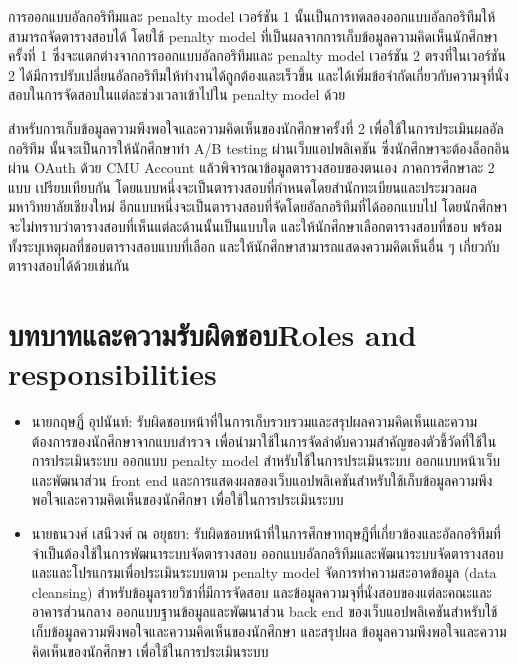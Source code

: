 การออกแบบอัลกอริทึมและ penalty model เวอร์ชัน 1 นั้นเป็นการทดลองออกแบบอัลกอริทึมให้สามารถจัดตารางสอบได้
โดยใช้ penalty model ที่เป็นผลจากการเก็บข้อมูลความคิดเห็นนักศึกษาครั้งที่ 1 
ซึ่งจะแตกต่างจากการออกแบบอัลกอริทึมและ penalty model เวอร์ชัน 2
ตรงที่ในเวอร์ชัน 2 ได้มีการปรับเปลี่ยนอัลกอริทึมให้ทำงานได้ถูกต้องและเร็วขึ้น และได้เพิ่มข้อจำกัดเกี่ยวกับความจุที่นั่งสอบในการจัดสอบในแต่ละช่วงเวลาเข้าไปใน penalty model ด้วย


สำหรับการเก็บข้อมูลความพึงพอใจและความคิดเห็นของนักศึกษาครั้งที่ 2 เพื่อใช้ในการประเมินผลอัลกอริทึม นั้นจะเป็นการให้นักศึกษาทำ A/B testing 
ผ่านเว็บแอปพลิเคชัน ซึ่งนักศึกษาจะต้องล็อกอินผ่าน OAuth ด้วย CMU Account แล้วพิจารณาข้อมูลตารางสอบของตนเอง ภาคการศึกษาละ 2 แบบ เปรียบเทียบกัน
โดยแบบหนึ่งจะเป็นตารางสอบที่กำหนดโดยสำนักทะเบียนและประมวลผล มหาวิทยาลัยเชียงใหม่ 
อีกแบบหนึ่งจะเป็นตารางสอบที่จัดโดยอัลกอริทึมที่ได้ออกแบบไป โดยนักศึกษาจะไม่ทราบว่าตารางสอบที่เห็นแต่ละด้านนั้นเป็นแบบใด และให้นักศึกษาเลือกตารางสอบที่ชอบ พร้อมทั้งระบุเหตุผลที่ชอบตารางสอบแบบที่เลือก
และให้นักศึกษาสามารถแสดงความคิดเห็นอื่น ๆ เกี่ยวกับตารางสอบได้ด้วยเช่นกัน

\section{\ifcpe บทบาทและความรับผิดชอบ\else Roles and responsibilities\fi}
\begin{itemize}
    \item นายกฤษฏิ์ อุปนันท์: รับผิดชอบหน้าที่ในการเก็บรวบรวมและสรุปผลความคิดเห็นและความต้องการของนักศึกษาจากแบบสำรวจ เพื่อนำมาใช้ในการจัดลำดับความสำคัญของตัวชี้วัดที่ใช้ในการประเมินระบบ ออกแบบ penalty model สำหรับใช้ในการประเมินระบบ 
    ออกแบบหน้าเว็บและพัฒนาส่วน front end และการแสดงผลของเว็บแอปพลิเคชันสำหรับใช้เก็บข้อมูลความพึงพอใจและความคิดเห็นของนักศึกษา เพื่อใช้ในการประเมินระบบ
    \item นายธนวงศ์ เสนีวงศ์ ณ อยุธยา: รับผิดชอบหน้าที่ในการศึกษาทฤษฎีที่เกี่ยวข้องและอัลกอริทึมที่จำเป็นต้องใช้ในการพัฒนาระบบจัดตารางสอบ 
    ออกแบบอัลกอริทึมและพัฒนาระบบจัดตารางสอบและและโปรแกรมเพื่อประเมินระบบตาม penalty model 
    จัดการทำความสะอาดข้อมูล (data cleansing) สำหรับข้อมูลรายวิชาที่มีการจัดสอบ และข้อมูลความจุที่นั่งสอบของแต่ละคณะและอาคารส่วนกลาง
    ออกแบบฐานข้อมูลและพัฒนาส่วน back end ของเว็บแอปพลิเคชันสำหรับใช้เก็บข้อมูลความพึงพอใจและความคิดเห็นของนักศึกษา
    และสรุปผล ข้อมูลความพึงพอใจและความคิดเห็นของนักศึกษา เพื่อใช้ในการประเมินระบบ
\end{itemize}

